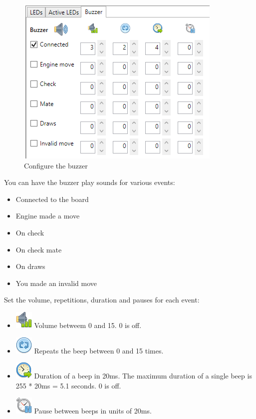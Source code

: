 \documentclass[11pt,a4paper]{article}
\begin{document}
\begin{figure}[H]
	\centering
	\includegraphics[scale=1.0]{iChessOneBuzzer1.png}
	\caption{Configure the buzzer}
	\label{fig:iChessOneBuzzer1}
\end{figure}
You can have the buzzer play sounds for various events:
\begin{itemize}
	\item Connected to the board
	\item Engine made a move
	\item On check
	\item On check mate
	\item On draws
	\item You  made an invalid move
\end{itemize}

Set the volume, repetitions, duration and pauses for each event:
\begin{itemize}
	\item \includegraphics[scale=0.3]{slideshow_volume.png} Volume betweem 0 and 15. 0 is off.
	\item \includegraphics[scale=0.3]{control_repeat_blue.png} Repeats the beep between 0 and 15 times. 
	\item \includegraphics[scale=0.3]{time_go.png} Duration of a beep in 20ms. The maximum duration of a single beep is 255 * 20ms = 5.1 seconds. 0 is off.
	\item \includegraphics[scale=0.3]{stopwatch_pause.png} Pause between beeps in units of 20ms.
\end{itemize}
\end{document}
